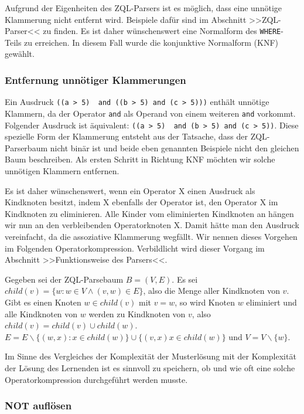 Aufgrund der Eigenheiten des ZQL-Parsers ist es möglich, dass eine unnötige Klammerung nicht entfernt wird. Beispiele dafür sind im Abschnitt >>ZQL-Parser<< zu finden. Es ist daher wünschenswert eine Normalform des \verb|WHERE|-Teils zu erreichen. In diesem Fall wurde die konjunktive Normalform (KNF) gewählt.


\subsubsection{Entfernung unnötiger Klammerungen}
\label{subsubsec:opcomp}

Ein Ausdruck \verb|((a > 5)  and ((b > 5) and (c > 5)))| enthält unnötige Klammern, da der Operator \verb|and| als Operand von einem weiteren \verb|and| vorkommt. Folgender Ausdruck ist äquivalent: \verb|((a > 5)  and (b > 5) and (c > 5))|. Diese spezielle Form der Klammerung entsteht aus der Tatsache, dass der ZQL-Parserbaum nicht binär ist und beide eben genannten Beispiele nicht den gleichen Baum beschreiben. Als ersten Schritt in Richtung KNF möchten wir solche unnötigen Klammern entfernen. 

Es ist daher wünschenswert, wenn ein Operator X einen Ausdruck als Kindknoten besitzt, indem X ebenfalls der Operator ist, den Operator X im Kindknoten zu eliminieren. Alle Kinder vom eliminierten Kindknoten an hängen wir nun an den verbleibenden Operatorknoten X. Damit hätte man den Ausdruck vereinfacht, da die assoziative Klammerung wegfällt. Wir nennen dieses Vorgehen im Folgenden Operatorkompression. Verbildlicht wird dieser Vorgang im Abschnitt >>Funktionsweise des Parsers<<.

Gegeben sei der ZQL-Parsebaum $B=(V,E)$. Es sei $child(v) = \{ w : w\in V \wedge (v,w)\in E\}$, also die Menge aller Kindknoten von $v$. Gibt es einen Knoten $w\in child(v)$ mit $v=w$, so wird Knoten $w$ eliminiert und alle Kindknoten von $w$ werden zu Kindknoten von $v$, also $child(v) = child(v) \cup child(w)$. 
$E=E\backslash \{ (w,x) : x\in child(w)\} \cup \{(v,x) x\in child(w)\}$ und $V=V\backslash \{w\}$.

Im Sinne des Vergleiches der Komplexität der Musterlösung mit der Komplexität der Lösung des Lernenden ist es sinnvoll zu speichern, ob und wie oft eine solche Operatorkompression durchgeführt werden musste.

\subsubsection{NOT auflösen}

